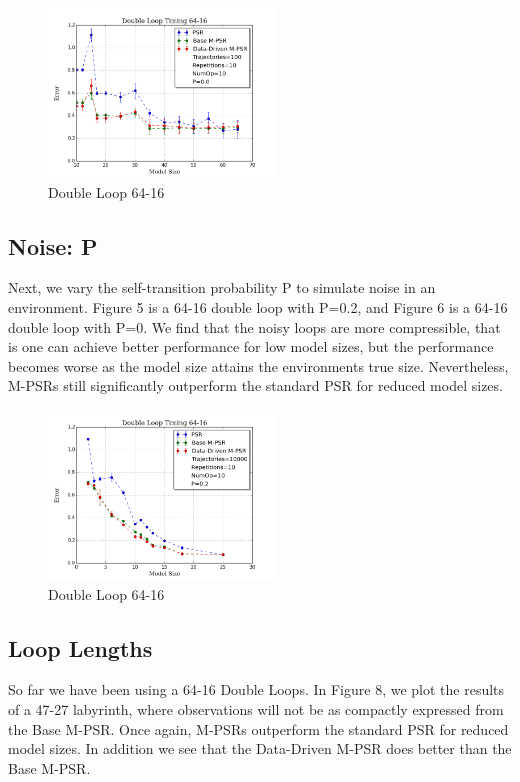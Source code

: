 \begin{figure}[ht!]
\centering
\includegraphics[width=60mm]{uCOREPICS/DL/64-16-100.png}
\caption{Double Loop 64-16\label{overflow}}
\end{figure}

\subsection{Noise: P}

Next, we vary the self-transition probability P to simulate noise in an environment. Figure 5 is a 64-16 double loop with P=0.2, and Figure 6 is a 64-16 double loop with P=0. We find that the noisy loops are more compressible, that is one can achieve better performance for low model sizes, but the performance becomes worse as the model size attains the environments true size. Nevertheless, M-PSRs still significantly outperform the standard PSR for reduced model sizes.

\begin{figure}[ht!]
\centering
\includegraphics[width=60mm]{uCOREPICS/DL/NoiseInfo.png}
\caption{Double Loop 64-16\label{overflow}}
\end{figure}

\subsection{Loop Lengths}

So far we have been using a 64-16 Double Loops. In Figure 8, we plot the results of a 47-27 labyrinth, where observations will not be as compactly expressed from the Base M-PSR. Once again, M-PSRs outperform the standard PSR for reduced model sizes. In addition we see that the Data-Driven M-PSR does better than the Base M-PSR.

